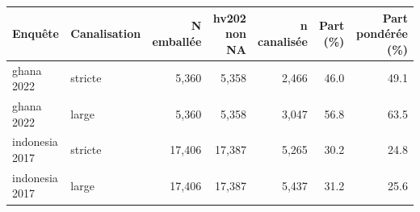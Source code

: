 \begin{tabular}{llrrrrr}
\toprule
Enqu\^ete & Canalisation & N emball\'ee & hv202 non NA & n canalis\'ee & Part (\%) & Part pond\'er\'ee (\%) \\
\midrule
ghana 2022 & stricte &  5,360 &  5,358 & 2,466 & 46.0 & 49.1 \\
ghana 2022 & large &  5,360 &  5,358 & 3,047 & 56.8 & 63.5 \\
indonesia 2017 & stricte & 17,406 & 17,387 & 5,265 & 30.2 & 24.8 \\
indonesia 2017 & large & 17,406 & 17,387 & 5,437 & 31.2 & 25.6 \\
\bottomrule
\end{tabular}
